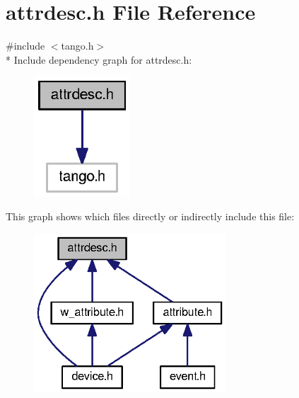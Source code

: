 \section{attrdesc.\-h File Reference}
\label{attrdesc_8h}
{\ttfamily \#include $<$tango.\-h$>$}\\*
Include dependency graph for attrdesc.\-h\-:
\nopagebreak
\begin{figure}[H]
\begin{center}
\leavevmode
\includegraphics[width=102pt]{d6/d38/attrdesc_8h__incl}
\end{center}
\end{figure}
This graph shows which files directly or indirectly include this file\-:
\nopagebreak
\begin{figure}[H]
\begin{center}
\leavevmode
\includegraphics[width=203pt]{d6/d5f/attrdesc_8h__dep__incl}
\end{center}
\end{figure}

